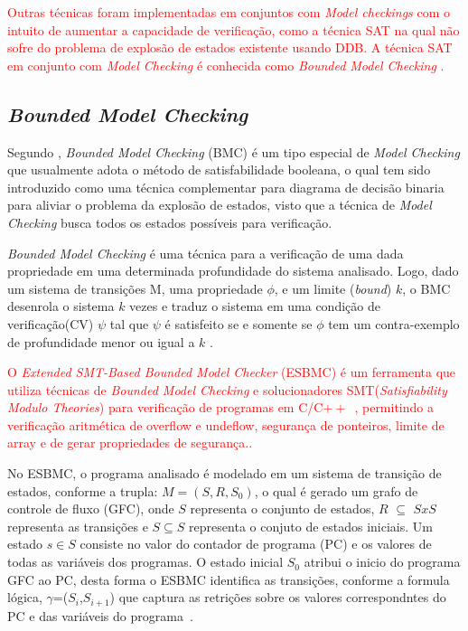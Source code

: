 \par
\textcolor{red}{Outras técnicas foram implementadas em conjuntos com \textit{Model checkings} com o intuito de aumentar a capacidade de verificação, como a técnica SAT na qual não sofre do problema de explosão de estados existente usando DDB. A técnica SAT em conjunto com \textit{Model Checking} é conhecida como \textit{Bounded Model Checking} \cite{biere2003bounded}.}

\subsection{\label{cap:bounded}\textit{Bounded Model Checking}}
Segundo , \textit{Bounded Model Checking} (BMC) é um tipo especial de \textit{Model Checking} que usualmente adota o método de satisfabilidade booleana, o qual tem sido introduzido como uma técnica complementar para diagrama de decisão binaria para aliviar o problema da explosão de estados, visto que a técnica de \textit{Model Checking} busca todos os estados possíveis para verificação.

\par
\textit{Bounded Model Checking} é uma técnica para a verificação de uma dada propriedade em uma determinada profundidade do sistema analisado. Logo, dado um sistema de transições M, uma propriedade $\phi$, e um limite (\textit{bound}) $k$, o BMC desenrola o sistema $k$ vezes e traduz o sistema em uma condição de verificação(CV) $\psi$ tal que $\psi$ é satisfeito se e somente se $\phi$ tem um contra-exemplo de profundidade menor ou igual a $k$ \cite{rocha2015verificaccao}.

\par
\textcolor{red}{O \textit{Extended SMT-Based Bounded Model Checker} (ESBMC) é um ferramenta que utiliza técnicas de \textit{Bounded Model Checking} e solucionadores SMT(\textit{Satisfiability Modulo Theories}) para verificação de programas em C/C$++$~\cite{rocha2015model}, permitindo a verificação aritmética de overflow e undeflow, segurança de ponteiros, limite de array e de gerar propriedades de segurança.\cite{cordeiro2012smt,rocha2015verificaccao}.} 

\par
No ESBMC, o programa analisado é modelado em um sistema de transição de estados, conforme a trupla: $M=(S,R,S_{0})$, o qual é gerado um grafo de controle de fluxo (GFC), onde $S$ representa o conjunto de estados, $R$ $\subseteq$ $SxS$ representa as transições e $S \subseteq S$ representa o conjuto de estados iniciais. Um estado $s \in S$ consiste no valor do contador de programa (PC) e os valores de todas as variáveis dos programas. O estado inicial $S_{0}$ atribui o inicio do programa GFC ao PC, desta forma o ESBMC identifica as transições, conforme a formula lógica, $\gamma$=($S_{i}$,$S_{i+1}$) que captura as retrições sobre os valores correspondntes do PC e das variáveis do programa~\cite{cordeiro2012smt}.

